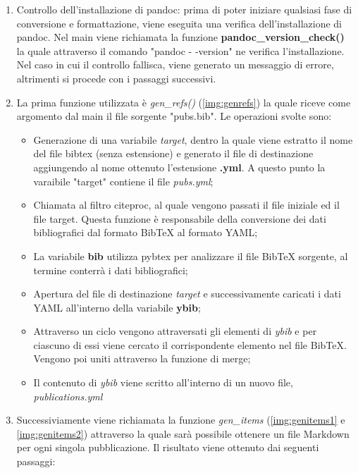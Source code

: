 \documentclass[target=bach,aauheader=]{thud}
\begin{document}
\begin{enumerate}
    \item Controllo dell'installazione di pandoc: prima di poter iniziare qualsiasi fase di conversione e formattazione, viene eseguita una verifica dell'installazione di pandoc. 
    \newline
    Nel main viene richiamata la funzione \textbf{pandoc\_version\_check()} la quale attraverso il comando "pandoc - -version" ne verifica l'installazione. 
    Nel caso in cui il controllo fallisca, viene generato un messaggio di errore, altrimenti si procede con i passaggi successivi.
    \item La prima funzione utilizzata è \textit{gen\_refs()} (\cref{img:genrefs}) la quale riceve come argomento dal main il file sorgente "pubs.bib". Le operazioni svolte sono:
    \begin{itemize}
        \item Generazione di una variabile \textit{target}, dentro la quale viene estratto il nome del file bibtex (senza estensione) e generato il file di destinazione aggiungendo al nome ottenuto l'estensione \textbf{.yml}. A questo punto la varaibile "target" contiene il file \textit{pubs.yml};
        \item Chiamata al filtro citeproc, al quale vengono passati il file iniziale ed il file target. Questa funzione è responsabile della conversione dei dati bibliografici dal formato BibTeX al formato YAML;
        \item La variabile \textbf{bib} utilizza pybtex per analizzare il file BibTeX sorgente, al termine conterrà i dati bibliografici;
        \item Apertura del file di destinazione \textit{target} e successivamente caricati i dati YAML all'interno della variabile \textbf{ybib};
        \item Attraverso un ciclo vengono attraversati gli elementi di \textit{ybib} e per ciascuno di essi viene cercato il corrispondente elemento nel file BibTeX. Vengono poi uniti attraverso la funzione di merge; 
        \item Il contenuto di \textit{ybib} viene scritto all'interno di un nuovo file, \textit{publications.yml} 
    \end{itemize}
    \item Successiviamente viene richiamata la funzione \textit{gen\_items} (\cref{img:genitems1} e \cref{img:genitems2}) attraverso la quale sarà possibile ottenere un file Markdown per ogni singola pubblicazione. Il risultato viene ottenuto dai seguenti passaggi:

\end{enumerate}
\end{document}
